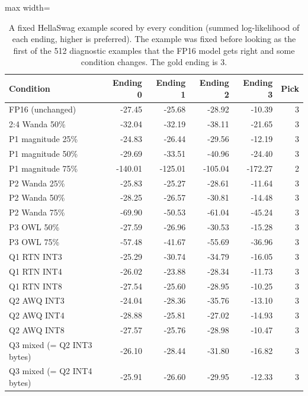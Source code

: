 \begin{table}[!htb]
\centering
\scriptsize
\setlength{\tabcolsep}{3.5pt}
\caption{A fixed HellaSwag example scored by every condition (summed log-likelihood of each ending, higher is preferred). The example was fixed before looking as the first of the 512 diagnostic examples that the FP16 model gets right and some condition changes. The gold ending is 3.}
\label{tab:t1qual}
\begin{adjustbox}{max width=\linewidth}
\begin{tabular}{lrrrrr}
\toprule
Condition & Ending 0 & Ending 1 & Ending 2 & Ending 3 & Pick \\
\midrule
FP16 (unchanged) & -27.45 & -25.68 & -28.92 & -10.39 & 3 \\
2:4 Wanda 50\% & -32.04 & -32.19 & -38.11 & -21.65 & 3 \\
P1 magnitude 25\% & -24.83 & -26.44 & -29.56 & -12.19 & 3 \\
P1 magnitude 50\% & -29.69 & -33.51 & -40.96 & -24.40 & 3 \\
P1 magnitude 75\% & -140.01 & -125.01 & -105.04 & -172.27 & 2 \\
P2 Wanda 25\% & -25.83 & -25.27 & -28.61 & -11.64 & 3 \\
P2 Wanda 50\% & -28.25 & -26.57 & -30.81 & -14.48 & 3 \\
P2 Wanda 75\% & -69.90 & -50.53 & -61.04 & -45.24 & 3 \\
P3 OWL 50\% & -27.59 & -26.96 & -30.53 & -15.28 & 3 \\
P3 OWL 75\% & -57.48 & -41.67 & -55.69 & -36.96 & 3 \\
Q1 RTN INT3 & -25.29 & -30.74 & -34.79 & -16.05 & 3 \\
Q1 RTN INT4 & -26.02 & -23.88 & -28.34 & -11.73 & 3 \\
Q1 RTN INT8 & -27.54 & -25.60 & -28.95 & -10.25 & 3 \\
Q2 AWQ INT3 & -24.04 & -28.36 & -35.76 & -13.10 & 3 \\
Q2 AWQ INT4 & -28.88 & -25.81 & -27.02 & -14.93 & 3 \\
Q2 AWQ INT8 & -27.57 & -25.76 & -28.98 & -10.47 & 3 \\
Q3 mixed (= Q2 INT3 bytes) & -26.10 & -28.44 & -31.80 & -16.82 & 3 \\
Q3 mixed (= Q2 INT4 bytes) & -25.91 & -26.60 & -29.95 & -12.33 & 3 \\
\bottomrule
\end{tabular}
\end{adjustbox}
\end{table}
